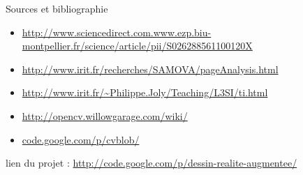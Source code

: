 \documentclass{beamer}
\begin{document}
      \begin{frame}{Sources et bibliographie}
   \begin{itemize}
	\item{\url{http://www.sciencedirect.com.www.ezp.biu-montpellier.fr/science/article/pii/S026288561100120X}}
	\item{\url{http://www.irit.fr/recherches/SAMOVA/pageAnalysis.html}}
	\item{\url{http://www.irit.fr/~Philippe.Joly/Teaching/L3SI/ti.html}}
	\item{\url{http://opencv.willowgarage.com/wiki/}}
	\item{\url{code.google.com/p/cvblob/} }
	\end{itemize}
  lien du projet : \url{http://code.google.com/p/dessin-realite-augmentee/}
      \end{frame}
\end{document}

